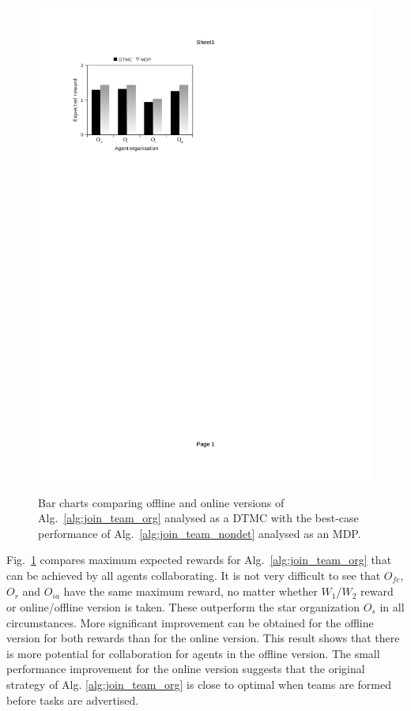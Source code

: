 \documentclass{llncs}
\begin{document}
\begin{figure}[t]
{\includegraphics[clip=true, trim=63 581.5 320 80, scale=0.63]{images/w2_mdp_online}
}
\caption{Bar charts comparing offline and online versions of Alg.~\ref{alg:join_team_org} analysed as a DTMC with the best-case performance of Alg.~\ref{alg:join_team_nondet} analysed as an MDP. }
\label{fig:bar_chart_mdp}
\end{figure}
Fig.~\ref{fig:bar_chart_mdp} compares maximum expected rewards for Alg.~\ref{alg:join_team_org} that can be achieved by all agents collaborating.
It is not very difficult to see that $O_{\mathit{fc}}$, $O_r$ and $O_{ia}$ have the same maximum reward, no matter whether $W_1$/$W_2$ reward or online/offline version is taken. These outperform the star organization $O_s$ in all circumstances.
More significant improvement can be obtained for the offline version for both rewards than for the online version. This result shows that there is more potential for collaboration for agents in the offline version. The small performance improvement for the online version suggests that the original strategy of Alg. \ref{alg:join_team_org} is close to optimal when teams are formed before tasks are advertised.
\end{document}
